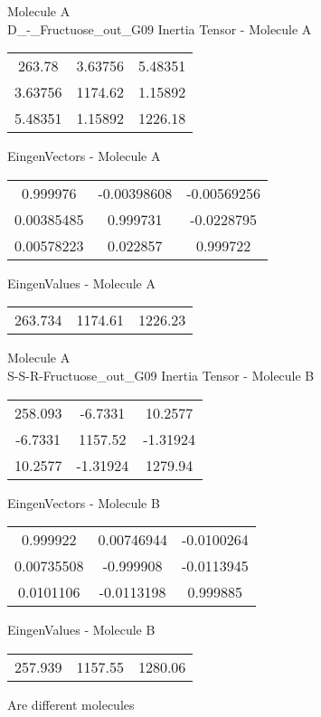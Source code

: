 \newpage
\begin{multicols}{2}
\begin{center}
Molecule A \\ 
D_-_Fructuose_out_G09
Inertia Tensor - Molecule A \\
\vtab
\begin{tabular}{|c c c|}
263.78	 & 	3.63756	 & 	5.48351	 \\
3.63756	 & 	1174.62	 & 	1.15892	 \\
5.48351	 & 	1.15892	 & 	1226.18
\end{tabular}

\vtab
 EingenVectors - Molecule A     \\
\vtab
\begin{tabular}{|c c c|}
0.999976	 & 	-0.00398608	 & 	-0.00569256	 \\
0.00385485	 & 	0.999731	 & 	-0.0228795	 \\
0.00578223	 & 	0.022857	 & 	0.999722
\end{tabular}

\vtab
 EingenValues - Molecule A     \\
\vtab
\begin{tabular}{|c c c|}
263.734	 & 	1174.61	 & 	1226.23
\end{tabular}
\columnbreak
Molecule A \\ 
S-S-R-Fructuose_out_G09
Inertia Tensor - Molecule B \\
\vtab
\begin{tabular}{|c c c|}
258.093	 & 	-6.7331	 & 	10.2577	 \\
-6.7331	 & 	1157.52	 & 	-1.31924	 \\
10.2577	 & 	-1.31924	 & 	1279.94
\end{tabular}

\vtab
 EingenVectors - Molecule B     \\
\vtab
\begin{tabular}{|c c c|}
0.999922	 & 	0.00746944	 & 	-0.0100264	 \\
0.00735508	 & 	-0.999908	 & 	-0.0113945	 \\
0.0101106	 & 	-0.0113198	 & 	0.999885
\end{tabular}

\vtab
 EingenValues - Molecule B     \\
\vtab
\begin{tabular}{|c c c|}
257.939	 & 	1157.55	 & 	1280.06
\end{tabular}
\textcolor{NavyBlue}{\large Are different molecules}
\end{center}
\end{multicols}

